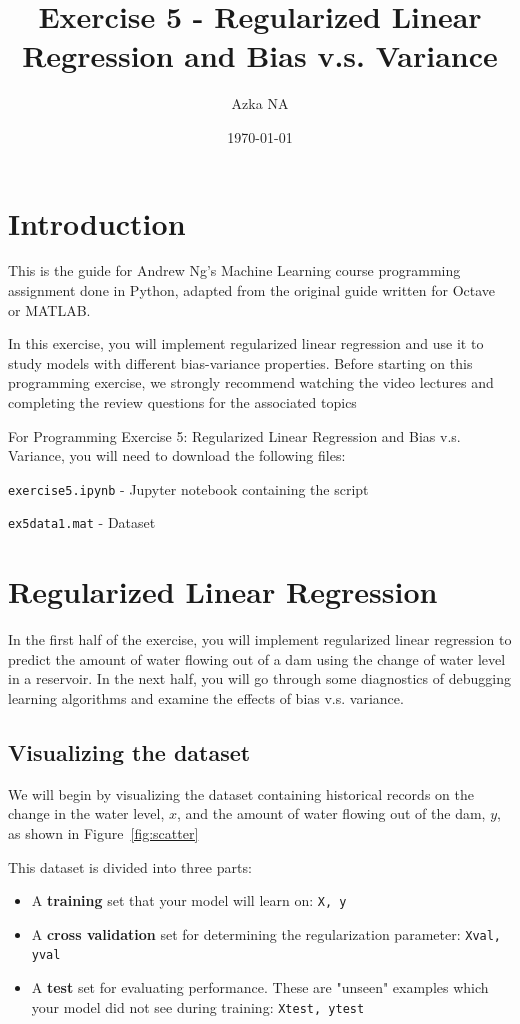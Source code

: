\documentclass[12pt]{article}
\title{Exercise 5 - Regularized Linear Regression and Bias v.s. Variance}
\author{Azka NA}
\date{\today}
\begin{document}
\maketitle


\section{Introduction}
This is the guide for Andrew Ng's Machine Learning course programming assignment done in Python, adapted from the original guide written for Octave or MATLAB.

In this exercise, you will implement regularized linear regression and use it to study models with different bias-variance properties. Before starting on this programming exercise, we strongly recommend watching the video lectures and completing the review questions for the associated topics

For Programming Exercise 5: Regularized Linear Regression and Bias v.s. Variance, you will need to download the following files:

\texttt{exercise5.ipynb} - Jupyter notebook containing the script

\texttt{ex5data1.mat} - Dataset

\hrulefill

\section{Regularized Linear Regression}

In the first half of the exercise, you will implement regularized linear regression to predict the amount of water flowing out of a dam using the change of water level in a reservoir. In the next half, you will go through some diagnostics of debugging learning algorithms and examine the effects of bias v.s. variance.

\subsection{Visualizing the dataset}

We will begin by visualizing the dataset containing historical records on the change in the water level, $x$, and the amount of water flowing out of the dam, $y$, as shown in Figure~\ref{fig:scatter}

This dataset is divided into three parts:

\begin{itemize}
  \item A \textbf{training} set that your model will learn on: \texttt{X, y}
  \item A \textbf{cross validation} set for determining the regularization parameter: \texttt{Xval, yval}
  \item A \textbf{test} set for evaluating performance. These are "unseen" examples which your model did not see during training: \texttt{Xtest, ytest}
\end{itemize}
\end{document}
